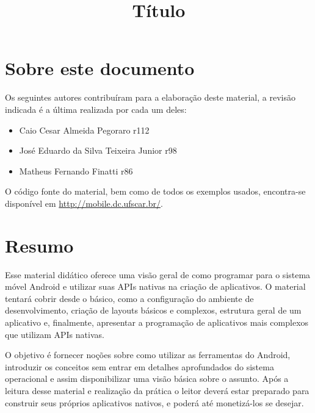 \documentclass[a4paper,12pt,brazil,oneside]{book}
\title{Título}
\begin{document}



\cleardoublepage

\onehalfspace

\pagestyle{plain}


\chapter*{Sobre este documento}
Os seguintes autores contribuíram para a elaboração deste material, a revisão indicada é a última realizada por cada um deles:
  \begin{itemize}
	\item Caio Cesar Almeida Pegoraro \dotfill r112
	\item José Eduardo da Silva Teixeira Junior \dotfill r98
    \item Matheus Fernando Finatti \dotfill r86
  \end{itemize}
O código fonte do material, bem como de todos os exemplos usados, encontra-se disponível em \href{http://mobile.dc.ufscar.br/}{http://mobile.dc.ufscar.br/}.
\thispagestyle{empty}

\chapter*{Resumo}

\doublespace
Esse material didático oferece uma visão geral de como programar para o sistema móvel Android e utilizar suas APIs nativas na criação de aplicativos. O material tentará cobrir desde o básico, como a configuração do ambiente de desenvolvimento, criação de layouts básicos e complexos, estrutura geral de um aplicativo e, finalmente, apresentar a programação de aplicativos mais complexos que utilizam APIs nativas.

O objetivo é fornecer noções sobre como utilizar as ferramentas do Android, introduzir os conceitos sem entrar em detalhes aprofundados do sistema operacional e assim disponibilizar uma visão básica sobre o assunto.
Após a leitura desse material e realização da prática o leitor deverá estar preparado para construir seus próprios aplicativos nativos, e poderá até monetizá-los se desejar.


\setcounter{tocdepth}{1} %

\tableofcontents
	
\end{document}
